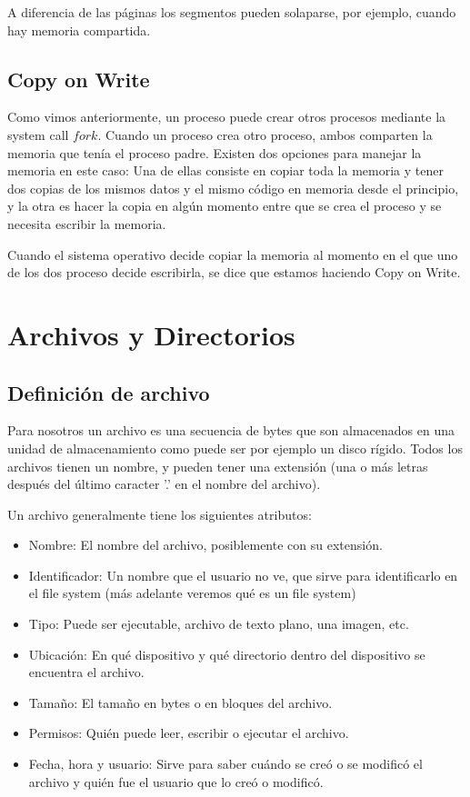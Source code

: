 \documentclass{article}
\begin{document}
A diferencia de las p\'aginas los segmentos pueden solaparse, por ejemplo, cuando hay memoria compartida.

\subsection{Copy on Write}

Como vimos anteriormente, un proceso puede crear otros procesos mediante la system call $fork$. Cuando un proceso crea otro proceso, ambos comparten la memoria que ten\'ia el proceso padre. Existen dos opciones para manejar la memoria en este caso: Una de ellas consiste en copiar toda la memoria y tener dos copias de los mismos datos y el mismo c\'odigo en memoria desde el principio, y la otra es hacer la copia en alg\'un momento entre que se crea el proceso y se necesita escribir la memoria.

Cuando el sistema operativo decide copiar la memoria al momento en el que uno de los dos proceso decide escribirla, se dice que estamos haciendo Copy on Write.

\section{Archivos y Directorios}

\subsection{Definici\'on de archivo}

Para nosotros un archivo es una secuencia de bytes que son almacenados en una unidad de almacenamiento como puede ser por ejemplo un disco r\'igido. Todos los archivos tienen un nombre, y pueden tener una extensi\'on (una o m\'as letras despu\'es del \'ultimo caracter '.' en el nombre del archivo).

Un archivo generalmente tiene los siguientes atributos:

\begin{itemize}
\item Nombre: El nombre del archivo, posiblemente con su extensi\'on.
\item Identificador: Un nombre que el usuario no ve, que sirve para identificarlo en el file system (m\'as adelante veremos qu\'e es un file system)
\item Tipo: Puede ser ejecutable, archivo de texto plano, una imagen, etc.
\item Ubicaci\'on: En qu\'e dispositivo y qu\'e directorio dentro del dispositivo se encuentra el archivo.
\item Tama\~no: El tama\~no en bytes o en bloques del archivo.
\item Permisos: Qui\'en puede leer, escribir o ejecutar el archivo.
\item Fecha, hora y usuario: Sirve para saber cu\'ando se cre\'o o se modific\'o el archivo y qui\'en fue el usuario que lo cre\'o o modific\'o.
\end{itemize}
\end{document}
